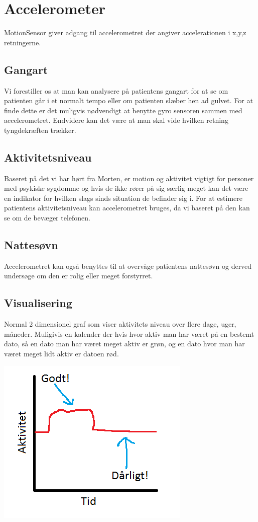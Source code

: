 \section{Accelerometer}

MotionSensor giver adgang til accelerometret der angiver accelerationen i x,y,z retningerne.

\subsection{Gangart}
Vi forestiller os at man kan analysere på patientens gangart for at se om patienten går i et normalt tempo eller om patienten slæber hen ad gulvet.
For at finde dette er det muligvis nødvendigt at benytte gyro sensoren sammen med accelerometret.
Endvidere kan det være at man skal vide hvilken retning tyngdekræften trækker.

\subsection{Aktivitetsniveau}
Baseret på det vi har hørt fra Morten, er motion og aktivitet vigtigt for personer med psykiske sygdomme og hvis de ikke rører på sig særlig meget kan det være en indikator for hvilken slags sinds situation de befinder sig i.
For at estimere patientens aktivitetsniveau kan accelerometret bruges, da vi baseret på den kan se om de bevæger telefonen. 

\subsection{Nattesøvn}
Accelerometret kan også benyttes til at overvåge patientens nattesøvn og derved undersøge om den er rolig eller meget forstyrret.


\subsection{Visualisering} Normal 2 dimensionel graf som viser aktivitets niveau over flere dage, uger, måneder. Muligivis en kalender der hvis hvor aktiv man har været på en bestemt dato, så en dato man har været meget aktiv er grøn, og en dato hvor man har været meget lidt aktiv er datoen rød.

\includegraphics{graphics/aktivitet_billed}

